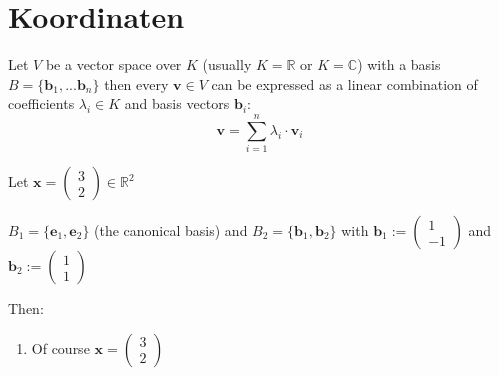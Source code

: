 
\section{Koordinaten}


Let $V$ be a vector space over $K$ (usually $K=\mathbb{R}$ or $K=\mathbb{C}$) with a basis $B=\{\bm{b}_1, ... \bm{b}_n\}$ then every $\bm{v} \in V$ can be expressed as a linear combination of coefficients $\lambda_i \in K$ and basis vectors $\bm{b}_i$:
\begin{equation}
    \bm{v} = \sum_{i=1}^n \lambda_i \cdot \bm{v}_i
\end{equation} 

\begin{example}
    Let $\bm{x}=\begin{pmatrix}
    3\\2
    \end{pmatrix} \in \mathbb{R}^2$
    
    $B_1 = \{\bm{e}_1, \bm{e}_2\}$ (the canonical basis) and $B_2=\{\bm{b}_1, \bm{b}_2\}$ with $\bm{b}_1:=\begin{pmatrix}
    1\\-1
    \end{pmatrix}$ and $\bm{b}_2:=\begin{pmatrix}
    1\\1
    \end{pmatrix}$

    Then: 
    \begin{enumerate}[itemsep=3pt, topsep=3pt]
        \item Of course $\bm{x}=\begin{pmatrix}
            3\\2
            \end{pmatrix}$
    \end{enumerate}
\end{example}


